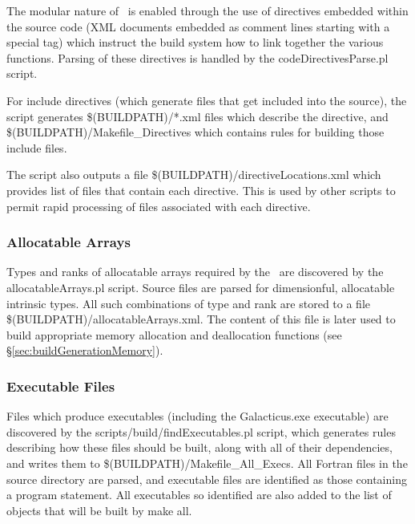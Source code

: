The modular nature of \glc\ is enabled through the use of directives embedded within the source code (XML documents embedded as comment lines starting with a special tag) which instruct the build system how to link together the various functions. Parsing of these directives is handled by the {\normalfont \ttfamily codeDirectivesParse.pl} script.

For {\normalfont \ttfamily include} directives (which generate files that get included into the source), the script generates {\normalfont \ttfamily \$(BUILDPATH)/*.xml} files which describe the directive, and {\normalfont \ttfamily \$(BUILDPATH)/Makefile\_Directives} which contains rules for building those include files.

The script also outputs a file {\normalfont \ttfamily \$(BUILDPATH)/directiveLocations.xml} which provides list of files that contain each directive. This is used by other scripts to permit rapid processing of files associated with each directive.

\subsubsection{Allocatable Arrays}\label{sec:buildDiscoverAllocatables}

Types and ranks of allocatable arrays required by the \glc\ are discovered by the {\normalfont \ttfamily allocatableArrays.pl} script. Source files are parsed for dimensionful, allocatable intrinsic types. All such combinations of type and rank are stored to a file {\normalfont \ttfamily \$(BUILDPATH)/allocatableArrays.xml}. The content of this file is later used to build appropriate memory allocation and deallocation functions (see \S\ref{sec:buildGenerationMemory}).

\subsubsection{Executable Files}\label{sec:buildExecutables}

Files which produce executables (including the {\normalfont \ttfamily Galacticus.exe} executable) are discovered by the {\normalfont \ttfamily scripts/build/findExecutables.pl} script, which generates rules describing how these files should be built, along with all of their dependencies, and writes them to {\normalfont \ttfamily \$(BUILDPATH)/Makefile\_All\_Execs}. All Fortran files in the {\normalfont \ttfamily source} directory are parsed, and executable files are identified as those containing a {\normalfont \ttfamily program} statement. All executables so identified are also added to the list of objects that will be built by {\normalfont \ttfamily make all}.

